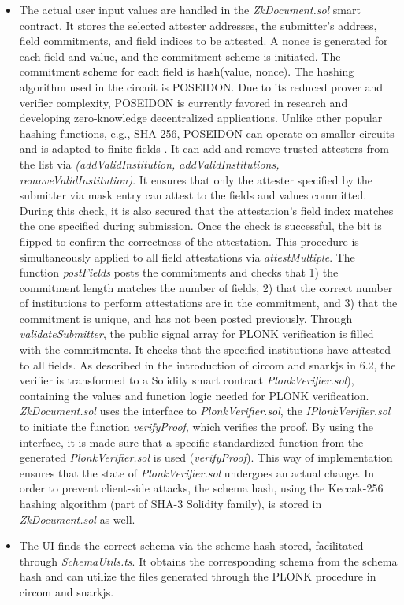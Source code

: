 \begin{itemize}
\item The actual user input values are handled in the \textit{ZkDocument.sol} smart contract. It stores the selected attester addresses, the submitter's address, field commitments, and field indices to be attested. A nonce is generated for each field and value, and the commitment scheme is initiated. The commitment scheme for each field is hash(value, nonce). The hashing algorithm used in the circuit is POSEIDON. Due to its reduced prover and verifier complexity, POSEIDON is currently favored in research and developing zero-knowledge decentralized applications. Unlike other popular hashing functions, e.g., SHA-256, POSEIDON can operate on smaller circuits and is adapted to finite fields \citep{poseidon}. It can add and remove trusted attesters from the list via \textit{(addValidInstitution, addValidInstitutions, removeValidInstitution)}. It ensures that only the attester specified by the submitter via mask entry can attest to the fields and values committed. During this check, it is also secured that the attestation's field index matches the one specified during submission. Once the check is successful, the bit is flipped to confirm the correctness of the attestation. This procedure is simultaneously applied to all field attestations via \textit{attestMultiple}. The function \textit{postFields} posts the commitments and checks that 1) the commitment length matches the number of fields, 2) that the correct number of institutions to perform attestations are in the commitment, and 3) that the commitment is unique, and has not been posted previously. Through \textit{validateSubmitter}, the public signal array for PLONK verification is filled with the commitments. It checks that the specified institutions have attested to all fields. As described in the introduction of circom and snarkjs in 6.2, the verifier is transformed to a Solidity smart contract \textit{PlonkVerifier.sol}), containing the values and function logic needed for PLONK verification. \textit{ZkDocument.sol} uses the interface to \textit{PlonkVerifier.sol}, the \textit{IPlonkVerifier.sol} to initiate the function \textit{verifyProof}, which verifies the proof. By using the interface, it is made sure that a specific standardized function from the generated \textit{PlonkVerifier.sol} is used (\textit{verifyProof}). This way of implementation ensures that the state of \textit{PlonkVerifier.sol} undergoes an actual change. In order to prevent client-side attacks, the schema hash, using the Keccak-256 hashing algorithm (part of SHA-3 Solidity family), is stored in \textit{ZkDocument.sol} as well. 

\item The UI finds the correct schema via the scheme hash stored, facilitated through \textit{SchemaUtils.ts}. It obtains the corresponding schema from the schema hash and can utilize the files generated through the PLONK procedure in circom and snarkjs.
\end{itemize}
